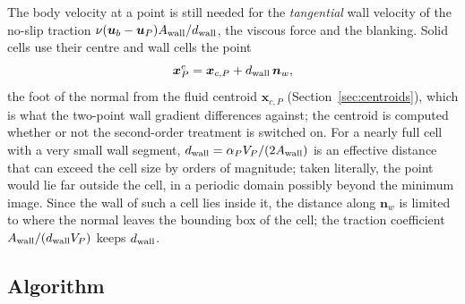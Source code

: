 \documentclass[11pt,a4paper]{article}
\theoremstyle{remark}
\newcommand{\uu}{\bm{u}}
\newcommand{\ub}{\uu_b}
\newcommand{\nn}{\bm{n}}
\newcommand{\xx}{\bm{x}}
\newcommand{\Aw}{A_{\rm wall}}
\newcommand{\dw}{d_{\rm wall}}
\begin{document}
The body velocity at a point is still needed for the \emph{tangential} wall velocity of the
no-slip traction $\nu(\ub-\uu_P)\Aw/\dw$, the viscous force and the blanking. Solid cells use their
centre and wall cells the point
\begin{equation}
\xx^e_P=\xx_{c,P}+\dw\,\nn_w ,
\label{eq:ubpoint}
\end{equation}
the foot of the normal from the fluid centroid $\xx_{c,P}$ (Section~\ref{sec:centroids}), which
is what the two-point wall gradient differences against; the centroid is computed whether or
not the second-order treatment is switched on.
For a nearly full cell with a very small wall segment, $\dw=\alpha_PV_P/(2\Aw)$ is an effective
distance that can exceed the cell size by orders of magnitude; taken literally, the point would
lie far outside the cell, in a periodic domain possibly beyond the minimum image. Since the wall
of such a cell lies inside it, the distance along $\nn_w$ is limited to where the normal leaves
the bounding box of the cell; the traction coefficient $\Aw/(\dw V_P)$ keeps $\dw$.

\subsection{Algorithm}
\label{sec:algo}
\end{document}
